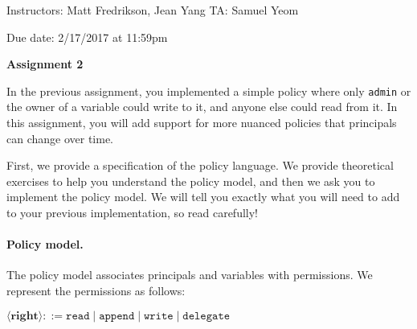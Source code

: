 \documentclass[11pt]{article}
\newcommand*{\stuname}{}
\newcommand*{\assignmentnumb}{2}
\begin{document}
\centerline{Instructors: Matt Fredrikson, Jean Yang \hfill TA: Samuel Yeom} 
\vspace{0.5ex}
Due date: 2/17/2017 at 11:59pm \\
\vspace{1.5ex}
\centerline{\Large\bf Assignment \assignmentnumb}
\vspace{0.5ex}
\centerline{\Large\bf \stuname}

In the previous assignment, you implemented a simple policy where only \texttt{admin} or the owner of a variable could write to it, and anyone else could read from it. In this assignment, you will add support for more nuanced policies that principals can change over time.

First, we provide a specification of the policy language. We provide theoretical exercises to help you understand the policy model, and then we ask you to implement the policy model. We will tell you exactly what you will need to add to your previous implementation, so read carefully!

\paragraph{Policy model.}
The policy model associates principals and variables with permissions. We represent the permissions as follows:

$\langle\mathbf{right}\rangle ::= \texttt{read} \mid \texttt{append} \mid \texttt{write} \mid \texttt{delegate}$
\end{document}
